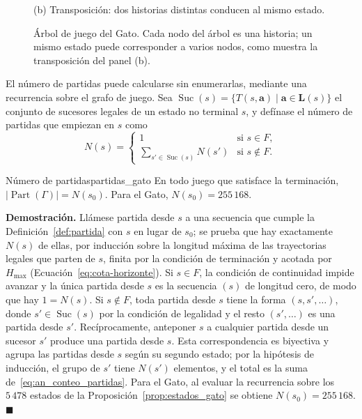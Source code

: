 \begin{figure}[htbp]
\vspace{0.6em}
{\small (b) Transposición: dos historias distintas conducen al mismo estado.}
\caption{Árbol de juego del Gato. Cada nodo del árbol es una historia; un mismo estado puede corresponder a varios nodos, como muestra la transposición del panel (b).}
\label{fig:an_arbol_gato}
\end{figure}

El número de partidas puede calcularse sin enumerarlas, mediante una recurrencia sobre el grafo de juego. Sea $\operatorname{Suc}(s) = \{T(s, \mathbf a) \mid \mathbf a \in \mathbf L(s)\}$ el conjunto de sucesores legales de un estado no terminal $s$, y defínase el número de partidas que empiezan en $s$ como
\begin{equation}
    N(s) =
    \begin{cases}
        1 & \text{si } s \in F,\\[2pt]
        \displaystyle\sum_{s' \in \operatorname{Suc}(s)} N(s') & \text{si } s \notin F.
    \end{cases}
    \label{eq:an_conteo_partidas}
\end{equation}

\begin{proposicion}{Número de partidas}{partidas_gato}
En todo juego que satisface la terminación, $|\operatorname{Part}(\Gamma)| = N(s_0)$. Para el Gato, $N(s_0) = 255\,168$.
\end{proposicion}

\noindent\textbf{Demostración.} Llámese partida desde $s$ a una secuencia que cumple la Definición~\ref{def:partida} con $s$ en lugar de $s_0$; se prueba que hay exactamente $N(s)$ de ellas, por inducción sobre la longitud máxima de las trayectorias legales que parten de $s$, finita por la condición de terminación y acotada por $H_{\max}$ (Ecuación~\eqref{eq:cota-horizonte}). Si $s \in F$, la condición de continuidad impide avanzar y la única partida desde $s$ es la secuencia $(s)$ de longitud cero, de modo que hay $1 = N(s)$. Si $s \notin F$, toda partida desde $s$ tiene la forma $(s, s', \dots)$, donde $s' \in \operatorname{Suc}(s)$ por la condición de legalidad y el resto $(s', \dots)$ es una partida desde $s'$. Recíprocamente, anteponer $s$ a cualquier partida desde un sucesor $s'$ produce una partida desde $s$. Esta correspondencia es biyectiva y agrupa las partidas desde $s$ según su segundo estado; por la hipótesis de inducción, el grupo de $s'$ tiene $N(s')$ elementos, y el total es la suma de~\eqref{eq:an_conteo_partidas}. Para el Gato, al evaluar la recurrencia sobre los $5\,478$ estados de la Proposición~\ref{prop:estados_gato} se obtiene $N(s_0) = 255\,168$. \hfill $\blacksquare$

